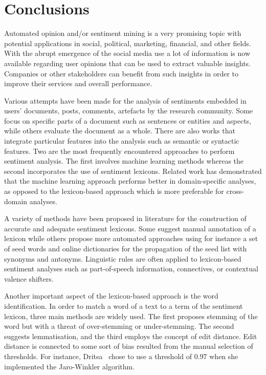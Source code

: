\section{Conclusions}
\label{sec:conclusions1}

Automated opinion and/or sentiment mining is a very promising topic
with potential applications in social, political, marketing, financial,
and other fields.
With the abrupt emergence of the social media use 
a lot of information is now available regarding user opinions
that can be used to extract valuable insights.
Companies or other stakeholders can benefit from such insights
in order to improve their services and overall performance.

Various attempts have been made for the analysis of sentiments
embedded in users' documents, posts, comments, artefacts
by the research community.
Some focus on specific parts of a document such as sentences
or entities and aspects, while others evaluate the document as a whole.
There are also works that integrate particular features into the analysis
such as semantic or syntactic features.
Two are the most frequently encountered approaches to perform sentiment analysis.
The first involves machine learning methods
whereas the second incorporates the use of sentiment lexicons.
Related work has demonstrated that the machine learning approach performs better
in domain-specific analyses, as opposed to the lexicon-based approach
which is more preferable for cross-domain analyses.

A variety of methods have been proposed in literature
for the construction of accurate and adequate sentiment lexicons.
Some suggest manual annotation of a lexicon
while others propose more automated approaches
using for instance a set of seed words and online dictionaries
for the propagation of the seed list with synonyms and antonyms.
Linguistic rules are often applied to lexicon-based sentiment analyses
such as part-of-speech information, connectives, or contextual valence shifters.

Another important aspect of the lexicon-based approach is the word identification.
In order to match a word of a text to a term of the sentiment lexicon,
three main methods are widely used.
The first proposes stemming of the word but with a threat of over-stemming
or under-stemming. The second suggests lemmatisation,
and the third employs the concept of edit distance.
Edit distance is connected to some sort of bias
resulted from the manual selection of thresholds.
For instance, Dritsa~\cite{Dri18} chose to use a threshold of 0.97
when she implemented the Jaro-Winkler algorithm.

